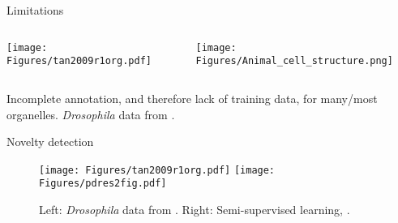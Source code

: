 

\begin{frame}{Limitations}
  \begin{columns}[t]
    \begin{column}[T]{0.43\textwidth}
      \begin{centering}
        \texttt{[image: Figures/tan2009r1org.pdf]}
      \end{centering} 
    \end{column}
    \begin{column}[T]{0.56\textwidth}      
      \texttt{[image: Figures/Animal\_cell\_structure.png]}
    \end{column}
  \end{columns}          
  Incomplete annotation, and therefore lack of training data, for
  many/most organelles. \textit{Drosophila} data from \cite{Tan2009}.
\end{frame}

\begin{frame}{Novelty detection}
  \begin{figure}
    \texttt{[image: Figures/tan2009r1org.pdf]}
    \texttt{[image: Figures/pdres2fig.pdf]}
    \caption{Left: \textit{Drosophila} data from
      \cite{Tan2009}. Right: Semi-supervised learning,
      \cite{Breckels:2013}.}
  \end{figure} 
\end{frame}


